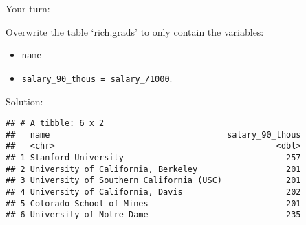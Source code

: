 \documentclass[ignorenonframetext,]{beamer}
\newenvironment{Shaded}{\begin{snugshade}}{\end{snugshade}}
\newcommand{\KeywordTok}[1]{\textcolor[rgb]{0.13,0.29,0.53}{\textbf{#1}}}
\newcommand{\DataTypeTok}[1]{\textcolor[rgb]{0.13,0.29,0.53}{#1}}
\newcommand{\DecValTok}[1]{\textcolor[rgb]{0.00,0.00,0.81}{#1}}
\newcommand{\StringTok}[1]{\textcolor[rgb]{0.31,0.60,0.02}{#1}}
\newcommand{\OperatorTok}[1]{\textcolor[rgb]{0.81,0.36,0.00}{\textbf{#1}}}
\newcommand{\NormalTok}[1]{#1}
\providecommand{\tightlist}{%
	\setlength{\itemsep}{0pt}\setlength{\parskip}{0pt}}
\begin{document}
\begin{frame}[fragile]{Your turn:}

Overwrite the table `rich.grads' to only contain the variables:

\begin{itemize}
\tightlist
\item
  \texttt{name}\\
\item
  \texttt{salary\_90\_thous\ =\ salary\_/1000}.
\end{itemize}

\end{frame}

\begin{frame}[fragile]{Solution:}

\begin{Shaded}
\end{Shaded}

\begin{verbatim}
## # A tibble: 6 x 2
##   name                                    salary_90_thous
##   <chr>                                             <dbl>
## 1 Stanford University                                 257
## 2 University of California, Berkeley                  201
## 3 University of Southern California (USC)             201
## 4 University of California, Davis                     202
## 5 Colorado School of Mines                            201
## 6 University of Notre Dame                            235
\end{verbatim}

\end{frame}
\end{document}
